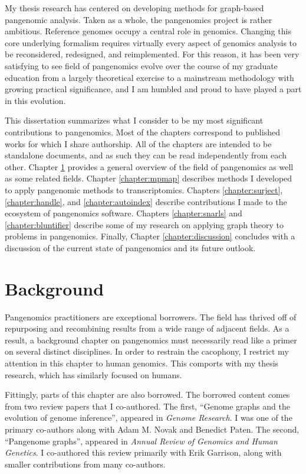 \documentclass[11pt]{ucthesis}
\begin{document}
My thesis research has centered on developing methods for graph-based pangenomic analysis. Taken as a whole, the pangenomics project is rather ambitious. Reference genomes occupy a central role in genomics. Changing this core underlying formalism requires virtually every aspect of genomics analysis to be reconsidered, redesigned, and reimplemented. For this reason, it has been very satisfying to see field of pangenomics evolve over the course of my graduate education from a largely theoretical exercise to a mainstream methodology with growing practical significance, and I am humbled and proud to have played a part in this evolution.

This dissertation summarizes what I consider to be my most significant contributions to pangenomics. Most of the chapters correspond to published works for which I share authorship. All of the chapters are intended to be standalone documents, and as such they can be read independently from each other. Chapter \ref{chapter:background} provides a general overview of the field of pangenomics as well as some related fields. Chapter \ref{chapter:mpmap} describes methods I developed to apply pangenomic methods to transcriptomics. Chapters \ref{chapter:surject}, \ref{chapter:handle}, and \ref{chapter:autoindex} describe contributions I made to the ecosystem of pangenomics software. Chapters \ref{chapter:snarls} and \ref{chapter:bluntifier} describe some of my research on applying graph theory to problems in pangenomics. Finally, Chapter \ref{chapter:discussion} concludes with a discussion of the current state of pangenomics and its future outlook.

\chapter{Background}

\label{chapter:background}

Pangenomics practitioners are exceptional borrowers. The field has thrived off of repurposing and recombining results from a wide range of adjacent fields. As a result, a background chapter on pangenomics must necessarily read like a primer on several distinct disciplines. In order to restrain the cacophony, I restrict my attention in this chapter to human genomics. This comports with my thesis research, which has similarly focused on humans. 

Fittingly, parts of this chapter are also borrowed. The borrowed content comes from two review papers that I co-authored. The first, ``Genome graphs and the evolution of genome inference'', appeared in \emph{Genome Research}. I was one of the primary co-authors along with Adam M. Novak and Benedict Paten\cite{paten2017genome}. The second, ``Pangenome graphs'', appeared in \emph{Annual Review of Genomics and Human Genetics}. I co-authored this review primarily with Erik Garrison, along with smaller contributions from many co-authors\cite{eizenga2020pangenome}.
\end{document}
